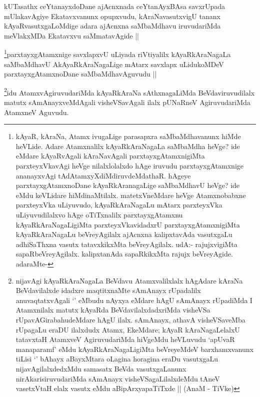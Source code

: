 \begin{artha}
kUTasathx ceYtanayxdoDane ajAcnxnada ceYtanAyxBAsa savxrUpada mUlakavAgiye Ekatavxvanunx opupxvudu, kAraNavasutxvigU tananx kAyaRvasutxgaLoMdige adara ajAcnxna saMbaMdhavu iruvudariMda meVlakxMDa Ekatavxvu saMmatavAgide ||
\end{artha}

\begin{artha}
\footnote{kAyaR, kAraNa, Atamx ivugaLige parasapxra saMbaMdhavanunx hiMde heVLide. Adare Atamxnalilx kAyaRkAraNagaLa saMbaMdha heVge? ide eMdare kAyaRvAgali kAraNavAgali parxtayxgAtamxnigiMta parxteyxVkavAgi heVge nilalxlolalxdo hAge iruvudu parxtayxgAtamxnige ananayxvAgi tAdAtamxyXdiMdiruvdeMdathaR. hAgeye parxtayxgAtamxnoDane kAyaRkAranagaLige saMbaMdhavU heVge? ide eMdu keVLidare hiMdinaMtilalx. matetxVneMdare heVge Atamxnobabxne parxteyxVka uLiyuvudo, kAyaRkAraNagaLu mAtarx parxteyxVka uLiyuvudilalxvo hAge oTiTxnalilx parxtayxgAtamxnu kAyaRkAraNagaLigiMta parxteyxVkavidadxrU parxtayxgAtamxnigiMta kAyaRkAraNagaLu beVreyAgilalx ajAcnxna kalipxtavAda vasutxgaLu adhiSaThxna vasutx tatavxkikxMta beVreyAgilalx. udA:- rajujxvigiMta sapaRbeVreyAgilalx. kalipxtanAda sapaRkikxMta rajujx beVreyAgide. adaraMte-}parxtayxgAtamxnige savxlapxvU uLiyada riVtiyalilx kAyaRkAraNagaLa saMbaMdhavU AkAyaRkAraNagaLige mAtarx savxlapx uLidukoMDeV parxtayxgAtamxnoDane saMbaMdhavAguvudu ||
\end{artha}

\begin{artha}
\footnote{nijavAgi kAyaRkAraNagaLa BeVdavu Atamxvalilxlalx hAgAdare kAraNa BeVdavilalxde idadxre maqtitxnaMte sAmAnayx rUpadalilx anuvaqtatxvAgali `\stext' eMbudu nAyxya eMdare hAgU sAmAnayx rUpadiMda I Atamxnilalx matutx kAyaRda BeVdavilalxdadxriMda visheVSa rUpavAGirabahudeMdare hAgU ilalx. sAmAnayx, athavA visheVSaveMba rUpagaLu eraDU ilalxdudx Atamx, EkeMdare; kAyaR kAraNagaLelalxU tatavxtaH AtamxveV AgiruvudariMda hiVgeMdu heVLuvudu `apUvaR manaparamf' eMdu kAyaRkAraNagaLigiMta beVreyeMdeV barxhamxvanunx tiLisi `\stext' bAhayx aBayxMtara oLagina horagina eraDu vasutxgaLu nijavAgilalxdedxMdu samasatx BeVda vasutxgaLanunx nirAkarisiruvudariMda sAmAnayx visheVSagaLilalxdeMdu tAneV vasetxVtaH elalx vasutx eMdu aBipArxyapaTiTxde || (AnaM - TiVke)}idu AtamxvAgiruvudariMda kAyaRkAraNa sAthxnagaLiMda BeVdaviruvudilalx matutx sAmAnayxveMdAgali visheVSavAgali ilalx pUNaRneV AgiruvudariMda AtamxneV Aguvudu.
\end{artha}

